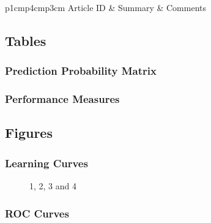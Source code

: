 \begin{table}[H]\centering
	\begin{tabular}{p{1cm}p{4cm}p{3cm}}
		Article ID & Summary & Comments\\
		\hline
		\hline
	\end{tabular}
\end{table}


\subsection{Tables}

\subsubsection{Prediction Probability Matrix}

\subsubsection{Performance Measures}

\subsection{Figures}

\subsubsection{Learning Curves}

\begin{figure}[H]
	\centering
	\begin{minipage}[b]{0.5\linewidth}
	\end{minipage}\hfill
	\begin{minipage}[b]{0.5\linewidth}
	\end{minipage}\hfill	
	\begin{minipage}[b]{0.5\linewidth}
	\end{minipage}\hfill
	\begin{minipage}[b]{0.5\linewidth}
	\end{minipage}\hfill
	\caption{1, 2, 3 and 4}
	\label{fig:Figure1}
\end{figure} 

\subsubsection{ROC Curves}

